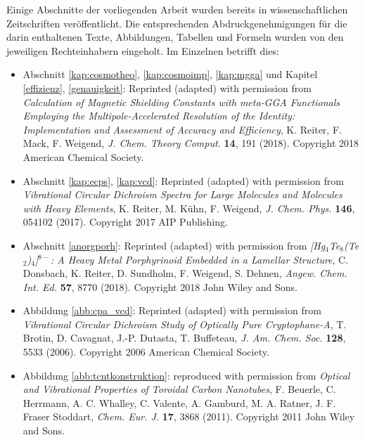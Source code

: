 Einige Abschnitte der vorliegenden Arbeit wurden bereits in wissenschaftlichen Zeitschriften veröffentlicht. Die entsprechenden Abdruckgenehmigungen für die darin enthaltenen Texte, Abbildungen, Tabellen und Formeln wurden von den jeweiligen Rechteinhabern eingeholt. Im Einzelnen betrifft dies:

\begin{itemize}
\item{Abschnitt \ref{kap:cosmotheo}, \ref{kap:cosmoimp}, \ref{kap:mgga} und Kapitel \ref{effizienz}, \ref{genauigkeit}: Reprinted (adapted) with permission from \textit{Calculation of Magnetic Shielding Constants with meta-GGA Functionals Employing the Multipole-Accelerated Resolution of the Identity: Implementation and Assessment of Accuracy and Efficiency}, K. Reiter, F. Mack, F. Weigend, \textit{J. Chem. Theory Comput.} \textbf{14}, 191 (2018). Copyright 2018 American Chemical Society.}
\item{Abschnitt \ref{kap:ecps}, \ref{kap:vcd}: Reprinted (adapted) with permission from \textit{Vibrational Circular Dichroism Spectra for Large Molecules and Molecules with Heavy Elements}, K. Reiter, M. Kühn, F. Weigend, \textit{J. Chem. Phys.} \textbf{146}, 054102 (2017). Copyright 2017 AIP Publishing.}
\item{Abschnitt \ref{anorgporh}: Reprinted (adapted) with permission from \textit{[Hg$_4$Te$_8$(Te$_2$)$_4$]$^{8-}$: A Heavy Metal Porphyrinoid Embedded in a Lamellar Structure}, C. Donsbach, K. Reiter, D. Sundholm, F. Weigend, S. Dehnen, \textit{Angew. Chem. Int. Ed.} \textbf{57}, 8770 (2018). Copyright 2018 John Wiley and Sons.}
\item{Abbildung \ref{abb:cpa_vcd}: Reprinted (adapted) with permission from \textit{Vibrational Circular Dichroism Study of Optically Pure Cryptophane-A}, T. Brotin, D. Cavagnat, J.-P. Dutasta, T. Buffeteau, \textit{J. Am. Chem. Soc.} \textbf{128}, 5533 (2006). Copyright 2006 American Chemical Society.}
\item{Abbildung \ref{abb:tcntkonstruktion}: reproduced with permission from \textit{Optical and Vibrational Properties of Toroidal Carbon Nanotubes}, F. Beuerle, C. Herrmann, A. C. Whalley, C. Valente, A. Gamburd, M. A. Ratner, J. F. Fraser Stoddart, \textit{Chem. Eur. J.} \textbf{17}, 3868 (2011). Copyright 2011 John Wiley and Sons.}
\end{itemize}
\vfill
\newpage
\thispagestyle{empty}
\cleardoublepage